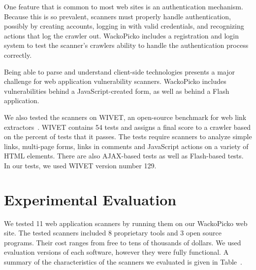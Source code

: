 One feature that is common to most web sites is an authentication
mechanism. Because this is so prevalent, scanners must properly handle
authentication, possibly by creating accounts, logging in with valid
credentials, and recognizing actions that log the crawler
out. WackoPicko includes a registration and login system to test the
scanner's crawlers ability to handle the authentication process correctly.

Being able to parse and understand 
client-side technologies presents a major challenge for web
application vulnerability scanners. WackoPicko includes
vulnerabilities behind a JavaScript-created form, as well as behind a
Flash application. 

We also tested the scanners on WIVET, an open-source 
benchmark for web link extractors~\cite{wivet}.  WIVET contains 54 tests and 
assigns a final score to a crawler based on the percent of tests that 
it passes. The tests require scanners to analyze
simple links, multi-page forms, links in comments
and JavaScript actions on a variety of HTML elements. There are also
AJAX-based tests as well as Flash-based tests. In our tests, we used WIVET 
version number 129.


\section{Experimental Evaluation}

We tested 11 web application scanners  by running them on our WackoPicko
web site. The tested scanners included 8 proprietary tools and 3 open
source programs. Their cost ranges from free to tens of thousands of
dollars. We used evaluation versions of each software, however they
were fully functional.
A summary of the characteristics of the scanners we evaluated is given
in Table~.

 

%
%

